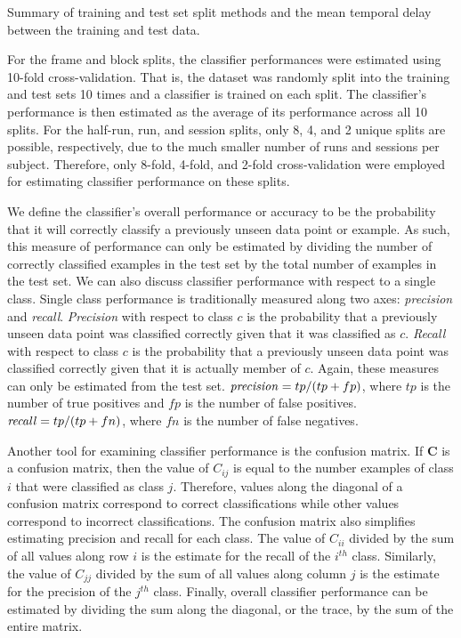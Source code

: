 \documentclass[preprint,5p,authoryear]{elsarticle}
\begin{document}
\begin{table}
\centering

\caption{Summary of training and test set split methods and the mean temporal delay between the training and test data.}
\label{tab:training-split}
\end{table}

For the frame and block splits, the classifier performances were estimated using 10-fold cross-validation.
That is, the dataset was randomly split into the training and test sets 10 times and a classifier is trained on each split.
The classifier's performance is then estimated as the average of its performance across all 10 splits.
For the half-run, run, and session splits, only 8, 4, and 2 unique splits are possible, respectively, due to the much smaller number of runs and sessions per subject. 
Therefore, only 8-fold, 4-fold, and 2-fold cross-validation were employed for estimating classifier performance on these splits.

We define the classifier's overall performance or accuracy to be the probability that it will correctly classify a previously unseen data point or example.
As such, this measure of performance can only be estimated by dividing the number of correctly classified examples in the test set by the total number of examples in the test set.
We can also discuss classifier performance with respect to a single class.
Single class performance is traditionally measured along two axes: \emph{precision} and \emph{recall}.
\emph{Precision} with respect to class $c$ is the probability that a previously unseen data point was classified correctly given that it was classified as $c$.
\emph{Recall} with respect to class $c$ is the probability that a previously unseen data point was classified correctly given that it is actually member of $c$.
Again, these measures can only be estimated from the test set.
$\mbox{\emph{precision}} = tp / (tp + fp)$, where $tp$ is the number of true positives and $fp$ is the number of false positives.
$\mbox{\emph{recall}} = tp / (tp + fn)$, where $fn$ is the number of false negatives.

Another tool for examining classifier performance is the confusion matrix.
If $\mathbf{C}$ is a confusion matrix, then the value of $C_{ij}$ is equal to the number examples of class $i$ that were classified as class $j$.
Therefore, values along the diagonal of a confusion matrix correspond to correct classifications while other values correspond to incorrect classifications.
The confusion matrix also simplifies estimating precision and recall for each class.
The value of $C_{ii}$ divided by the sum of all values along row $i$ is the estimate for the recall of the $i^{th}$ class.
Similarly, the value of $C_{jj}$ divided by the sum of all values along column $j$ is the estimate for the precision of the $j^{th}$ class.
Finally, overall classifier performance can be estimated by dividing the sum along the diagonal, or the trace, by the sum of the entire matrix.
\end{document}
